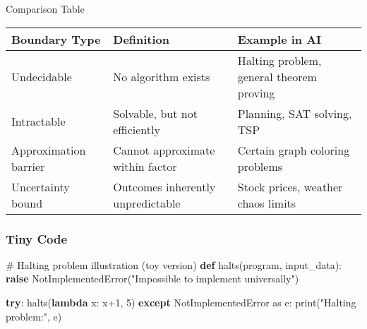 \documentclass[
  letterpaper,
  DIV=11,
  numbers=noendperiod]{scrreprt}
\newenvironment{Shaded}{\begin{snugshade}}{\end{snugshade}}
\newcommand{\BuiltInTok}[1]{\textcolor[rgb]{0.00,0.23,0.31}{#1}}
\newcommand{\CommentTok}[1]{\textcolor[rgb]{0.37,0.37,0.37}{#1}}
\newcommand{\ControlFlowTok}[1]{\textcolor[rgb]{0.00,0.23,0.31}{\textbf{#1}}}
\newcommand{\DecValTok}[1]{\textcolor[rgb]{0.68,0.00,0.00}{#1}}
\newcommand{\ImportTok}[1]{\textcolor[rgb]{0.00,0.46,0.62}{#1}}
\newcommand{\KeywordTok}[1]{\textcolor[rgb]{0.00,0.23,0.31}{\textbf{#1}}}
\newcommand{\NormalTok}[1]{\textcolor[rgb]{0.00,0.23,0.31}{#1}}
\newcommand{\OperatorTok}[1]{\textcolor[rgb]{0.37,0.37,0.37}{#1}}
\newcommand{\PreprocessorTok}[1]{\textcolor[rgb]{0.68,0.00,0.00}{#1}}
\newcommand{\StringTok}[1]{\textcolor[rgb]{0.13,0.47,0.30}{#1}}
\begin{document}
Comparison Table

\begin{longtable}[]{@{}
  >{\raggedright\arraybackslash}p{}
  >{\raggedright\arraybackslash}p{}
  >{\raggedright\arraybackslash}p{}@{}}
\toprule\noalign{}
\begin{minipage}[b]{\linewidth}\raggedright
Boundary Type
\end{minipage} & \begin{minipage}[b]{\linewidth}\raggedright
Definition
\end{minipage} & \begin{minipage}[b]{\linewidth}\raggedright
Example in AI
\end{minipage} \\
\midrule\noalign{}
\endhead
\bottomrule\noalign{}
\endlastfoot
Undecidable & No algorithm exists & Halting problem, general theorem
proving \\
Intractable & Solvable, but not efficiently & Planning, SAT solving,
TSP \\
Approximation barrier & Cannot approximate within factor & Certain graph
coloring problems \\
Uncertainty bound & Outcomes inherently unpredictable & Stock prices,
weather chaos limits \\
\end{longtable}

\subsubsection{Tiny Code}\label{tiny-code-39}

\begin{Shaded}
\begin{Highlighting}[]
\CommentTok{\# Halting problem illustration (toy version)}
\KeywordTok{def}\NormalTok{ halts(program, input\_data):}
    \ControlFlowTok{raise} \PreprocessorTok{NotImplementedError}\NormalTok{(}\StringTok{"Impossible to implement universally"}\NormalTok{)}

\ControlFlowTok{try}\NormalTok{:}
\NormalTok{    halts(}\KeywordTok{lambda}\NormalTok{ x: x}\OperatorTok{+}\DecValTok{1}\NormalTok{, }\DecValTok{5}\NormalTok{)}
\ControlFlowTok{except} \PreprocessorTok{NotImplementedError} \ImportTok{as}\NormalTok{ e:}
    \BuiltInTok{print}\NormalTok{(}\StringTok{"Halting problem:"}\NormalTok{, e)}
\end{Highlighting}
\end{Shaded}
\end{document}
